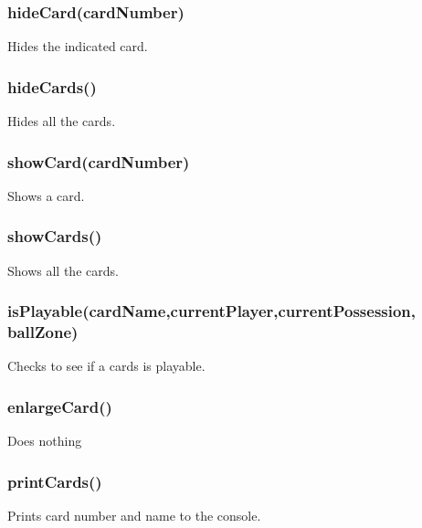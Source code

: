 \documentclass[12pt]{article}
\begin{document}
\subsubsection*{hideCard(cardNumber)}
Hides the indicated card.
\subsubsection*{hideCards()}
Hides all the cards. 
\subsubsection*{showCard(cardNumber)}
Shows a card. 
\subsubsection*{showCards()}
Shows all the cards.
\subsubsection*{isPlayable(cardName,currentPlayer,currentPossession,
ballZone)}
Checks to see if a cards is playable. 
\subsubsection*{enlargeCard()}
Does nothing
\subsubsection*{printCards()}
Prints card number and name to the console. 
\end{document}
